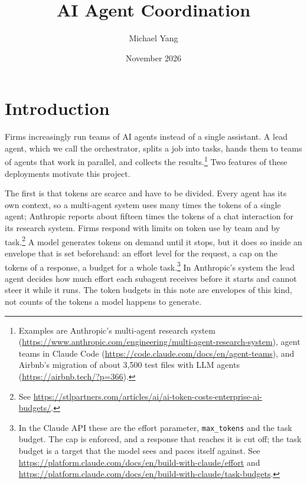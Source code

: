 \documentclass[11pt]{article}
\title{AI Agent Coordination}
\author{Michael Yang}
\date{November 2026}
\begin{document}
\maketitle

\section{Introduction}

Firms increasingly run teams of AI agents instead of a single assistant. A lead agent, which we call the orchestrator, splits a job into tasks, hands them to teams of agents that work in parallel, and collects the results.\footnote{Examples are Anthropic's multi-agent research system (\url{https://www.anthropic.com/engineering/multi-agent-research-system}), agent teams in Claude Code (\url{https://code.claude.com/docs/en/agent-teams}), and Airbnb's migration of about 3{,}500 test files with LLM agents (\url{https://airbnb.tech/?p=366}).} Two features of these deployments motivate this project.

The first is that tokens are scarce and have to be divided. Every agent has its own context, so a multi-agent system uses many times the tokens of a single agent; Anthropic reports about fifteen times the tokens of a chat interaction for its research system. Firms respond with limits on token use by team and by task.\footnote{See \url{https://stlpartners.com/articles/ai/ai-token-costs-enterprise-ai-budgets/}.} A model generates tokens on demand until it stops, but it does so inside an envelope that is set beforehand: an effort level for the request, a cap on the tokens of a response, a budget for a whole task.\footnote{In the Claude API these are the effort parameter, \texttt{max\_tokens} and the task budget. The cap is enforced, and a response that reaches it is cut off; the task budget is a target that the model sees and paces itself against. See \url{https://platform.claude.com/docs/en/build-with-claude/effort} and \url{https://platform.claude.com/docs/en/build-with-claude/task-budgets}.} In Anthropic's system the lead agent decides how much effort each subagent receives before it starts and cannot steer it while it runs. The token budgets in this note are envelopes of this kind, not counts of the tokens a model happens to generate.
\end{document}
